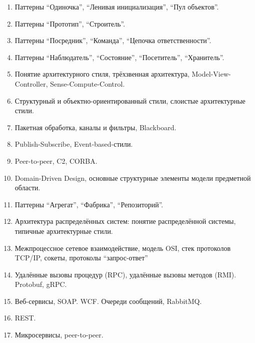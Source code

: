 \documentclass[a5paper]{article}
\begin{document}
\begin{enumerate}
	\item Паттерны ``Одиночка'', ``Ленивая инициализация'', ``Пул объектов''.
	\item Паттерны ``Прототип'', ``Строитель''.
	\item Паттерны ``Посредник'', ``Команда'', ``Цепочка ответственности''.
	\item Паттерны ``Наблюдатель'', ``Состояние'', ``Посетитель'', ``Хранитель''.
	\item Понятие архитектурного стиля, трёхзвенная архитектура, Model-View-Controller, Sense-Compute-Control.
	\item Структурный и объектно-ориентированный стили, слоистые архитектурные стили.
	\item Пакетная обработка, каналы и фильтры, Blackboard.
	\item Publish-Subscribe, Event-based-стили.
	\item Peer-to-peer, C2, CORBA.
	\item Domain-Driven Design, основные структурные элементы модели предметной области.
	\item Паттерны ``Агрегат'', ``Фабрика'', ``Репозиторий''.
	\item Архитектура распределённых систем: понятие распределённой системы, типичные архитектурные стили.
	\item Межпроцессное сетевое взаимодействие, модель OSI, стек протоколов TCP/IP, сокеты, протоколы ``запрос-ответ''
	\item Удалённые вызовы процедур (RPC), удалённые вызовы методов (RMI). Protobuf, gRPC.
	\item Веб-сервисы, SOAP. WCF. Очереди сообщений, RabbitMQ.
	\item REST.
	\item Микросервисы, peer-to-peer.
\end{enumerate}
\end{document}
